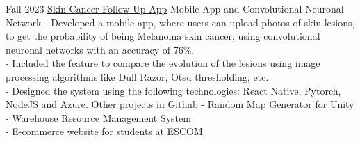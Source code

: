 \documentclass[9pt]{developercv} %
\begin{document}


\begin{entrylist}
	\entry
		{Fall 2023}
		{\href{https://github.com/EstebanOlmedo/melanoma-tt}{ Skin Cancer Follow Up App}}
		{Mobile App and Convolutional Neuronal Network}
		{- Developed a mobile app, where users can upload photos of skin lesions, to get the probability of being Melanoma skin cancer, using convolutional neuronal networks with an accuracy of 76\%.\\
        - Included the feature to compare the evolution of the lesions using image processing algorithms like Dull Razor, Otsu thresholding, etc.\\
		- Designed the system using the following technologies: React Native, Pytorch, NodeJS and Azure.}
	\entry
		{}
		{Other projects in Github}
		{}
		{
			- \href{https://github.com/DanielMontesGuerrero/random-map-generator}{ Random Map Generator for Unity}\\
			- \href{https://github.com/DanielMontesGuerrero/sistema-picking-app}{ Warehouse Resource Management System}\\
			- \href{https://github.com/DanielMontesGuerrero/la-tiendita}{ E-commerce website for students at ESCOM}\\
		}
\end{entrylist}

\end{document}
